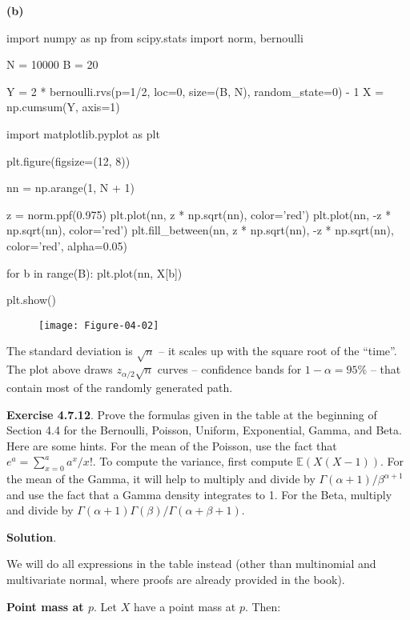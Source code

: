 \textbf{(b)}

\begin{python}
import numpy as np
from scipy.stats import norm, bernoulli

N = 10000
B = 20

Y = 2 * bernoulli.rvs(p=1/2, loc=0, size=(B, N), random_state=0) - 1
X = np.cumsum(Y, axis=1)
\end{python}

\begin{python}
import matplotlib.pyplot as plt

plt.figure(figsize=(12, 8))

nn = np.arange(1, N + 1)

z = norm.ppf(0.975)
plt.plot(nn, z * np.sqrt(nn), color='red')
plt.plot(nn, -z * np.sqrt(nn), color='red')
plt.fill_between(nn, z * np.sqrt(nn), -z * np.sqrt(nn), color='red', alpha=0.05)

for b in range(B):
    plt.plot(nn, X[b])
    
plt.show()
\end{python}

\begin{figure}[H]
\centering
\texttt{[image: Figure-04-02]}
\end{figure}

The standard deviation is \(\sqrt{n}\) -- it scales up with the square
root of the ``time''. The plot above draws \(z_{\alpha / 2} \sqrt{n}\)
curves -- confidence bands for \(1 - \alpha = 95\%\) -- that contain
most of the randomly generated path.

\textbf{Exercise 4.7.12}. Prove the formulas given in the table at the
beginning of Section 4.4 for the Bernoulli, Poisson, Uniform,
Exponential, Gamma, and Beta. Here are some hints. For the mean of the
Poisson, use the fact that \(e^{a} = \sum_{x=0}^{a} a^x / x!\). To compute
the variance, first compute \(\mathbb{E}(X(X - 1))\). For the mean of
the Gamma, it will help to multiply and divide by
\(\Gamma(\alpha + 1) / \beta^{\alpha + 1}\) and use the fact that a
Gamma density integrates to 1. For the Beta, multiply and divide by
\(\Gamma(\alpha + 1) \Gamma(\beta) / \Gamma(\alpha + \beta + 1)\).

\textbf{Solution}.

We will do all expressions in the table instead (other than multinomial
and multivariate normal, where proofs are already provided in the book).

\textbf{Point mass at \(p\)}. Let \(X\) have a point mass at \(p\).
Then:

